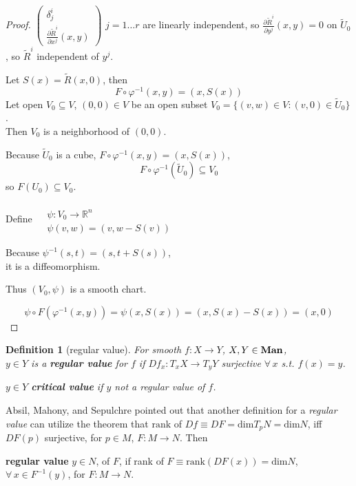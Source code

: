 \documentclass[10pt]{amsart}
\newtheorem{definition}{Definition}
\begin{document}
\begin{multicols*}{2}
\begin{proof}
	$\left( \begin{matrix} \delta^i_j \\ \frac{ \partial \widetilde{R}^i }{ \partial x^j}(x,y) \end{matrix} \right)$ $j=1\dots r$ are linearly independent, so $\frac{\partial \widetilde{R}^i}{ \partial y^j}(x,y) = 0$ on $\widetilde{U}_0$, so $\widetilde{R}^i$ independent of $y^j$.
	
	Let $S(x) = \widetilde{R}(x,0)$, then
	\[
	F \circ \varphi^{-1}(x,y) = (x, S(x))
	\]
	Let open $V_0 \subseteq V$, $(0,0) \in V$ be an open subset $V_0 = \lbrace (v,w) \in V: (v,0) \in \widetilde{U}_0 \rbrace$. \\
	Then $V_0 $ is a neighborhood of $(0,0)$.
	
	Because $\widetilde{U}_0$ is a cube, $F \circ \varphi^{-1}(x,y) = (x, S(x))$,
	\[
	F\circ \varphi^{-1}(\widetilde{U}_0) \subseteq V_0
	\]
	so $F(U_0) \subseteq V_0$.
	
	Define $\begin{aligned} & \quad \\ 
	& \psi : V_0 \to \mathbb{R}^n \\
	& \psi (v,w) = (v, w- S(v)) \end{aligned}$
	
	Because $\psi^{-1}(s,t) = (s, t+S(s))$, \\
	it is a diffeomorphism.
	
	Thus $(V_0, \psi)$ is a smooth chart. 
	
	\[
	\psi \circ F (\varphi^{-1}(x,y)) = \psi(x, S(x)) = (x, S(x) - S(x)) = (x, 0)
	\]
	

	\end{proof}


\begin{definition}[regular value]
	For smooth $f:X\to Y$, $X,Y \in \text{\textbf{Man}}$, \\
	$y\in Y$ is a \textbf{regular value} for $f$ if $Df_x:T_xX \to T_y Y$ surjective $\forall \, x$ s.t. $f(x)=y$.  
	
	$y\in Y$ \textbf{critical value} if $y$ not a regular value of $f$.  
\end{definition}

Absil, Mahony, and Sepulchre \cite{AMS2008} pointed out that another definition for a \emph{regular value} can utilize the theorem that $\text{rank}$ of $Df \equiv DF = \text{dim} T_pN = \text{dim} N$, iff $DF(p)$ surjective, for $p\in M$, $F:M\to N$.  Then 

\textbf{regular value} $y \in N$, of $F$, if rank of $F \equiv \text{rank}(DF(x)) = \text{dim}N$, $\forall \, x \in F^{-1}(y)$, for $F:M\to N$.  



\end{multicols*}
\end{document}
